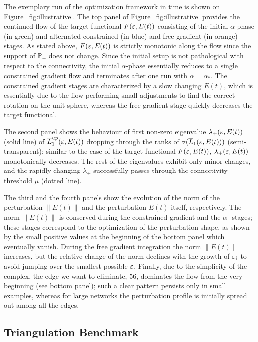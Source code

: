 The exemplary run of the optimization framework in time is shown on Figure~\ref{fig:illustrative}.
The top panel of Figure~\ref{fig:illustrative} provides the continued flow of the target functional $F(\varepsilon, E(t))$ consisting of the initial $\alpha$-phase (in green) and alternated constrained (in blue) and free gradient (in orange) stages. As stated above, $F(\varepsilon, E(t))$ is strictly monotonic along the flow since the support of $\mathbb P_+$  does not change. Since the initial setup is not pathological with respect to the connectivity, the initial  $\alpha$-phase essentially reduces to a single constrained gradient flow and terminates after one run with $\alpha=\alpha_*$.  The constrained gradient stages are characterized by a slow changing $E(t)$, which is essentially due to the flow performing small adjustments to find the correct rotation on the unit sphere, whereas the free gradient stage quickly decreases the target functional.

The second panel shows the  behaviour of first non-zero eigenvalue $\lambda_+(\varepsilon, E(t))$ (solid line) of $\overline{L}_1^{up}(\varepsilon, E(t))$ dropping through the ranks of $\sigma(\overline{L}_1(\varepsilon, E(t)))$ (semi-transparent); similar to the case of the target functional $F(\varepsilon, E(t))$, $\lambda_+(\varepsilon, E(t))$ monotonically decreases. The rest of the eigenvalues exhibit only minor changes, and the rapidly changing $\lambda_+$ successfully passes through the connectivity threshold $\mu$ (dotted line). 

The third and the fourth panels show the evolution of the norm of the perturbation $\| E(t) \|$ and the perturbation $E(t)$ itself, respectively.  The norm $\| E(t) \| $ is conserved during the constrained-gradient and the $\alpha$- stages; these stages correspond to the optimization of the perturbation shape, as shown by the small positive values at the beginning of the bottom panel which eventually vanish. During the free gradient integration the norm $\| E(t) \|$ increases, but the relative change of the norm declines with the growth of $\varepsilon_i$ to avoid jumping over the smallest possible $\varepsilon$. Finally, due to the simplicity of the complex, the  edge we want to eliminate, $56$, dominates the flow from the very beginning (see bottom panel); such a clear pattern persists only in small examples, whereas for large networks the perturbation profile is initially spread out among all the edges.


\subsection{Triangulation Benchmark}

